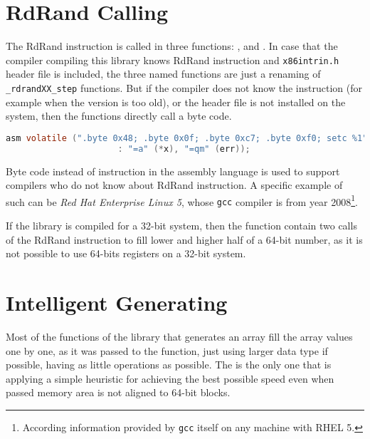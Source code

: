 \section{RdRand Calling}
\par{
The RdRand instruction is called in three functions: ,  and . In case that the compiler compiling this library knows RdRand instruction and {\tt x86intrin.h} header file is included, the three named functions are just a renaming of {\tt \_rdrandXX\_step} functions. But if the compiler does not know the instruction (for example when the version is too old), or the header file is not installed on the system, then the functions directly call a byte code.
}
\begin{lstlisting}[frame=none, basicstyle=\footnotesize\ttfamily, language=C, numbers=none, numberstyle=\tiny\color{black},caption= {Byte code called in {\tt rdrand64\_step}.}]
 asm volatile (".byte 0x48; .byte 0x0f; .byte 0xc7; .byte 0xf0; setc %1"
                      : "=a" (*x), "=qm" (err));
\end{lstlisting}

\par{
Byte code instead of instruction in the assembly language is used to support compilers who do not know about RdRand instruction. A specific example of such can be {\em Red Hat Enterprise Linux 5}, whose {\tt gcc} compiler is from year 2008\footnote{According information provided by {\tt gcc} itself on any machine with RHEL 5.}. 
}

\par{
If the library is compiled for a 32-bit system, then the  function contain two calls of the RdRand instruction to fill lower and higher half of a 64-bit number, as it is not possible to use 64-bits registers on a 32-bit system. 
}
\section{Intelligent Generating}
\par{
Most of the functions of the library that generates an array fill the array values one by one, as it was passed to the function, just using larger data type if possible, having as little operations as possible. The  is the only one that is applying a simple heuristic for achieving the best possible speed even when passed memory area is not aligned to 64-bit blocks.
}

